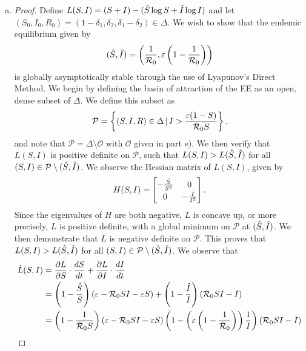\documentclass[12pt]{article}\usepackage[]{graphicx}\usepackage[]{color}
\begin{document}
\begin{enumerate}[(a)]
\item \SIRg
{\color{blue}\begin{proof}{\color{magenta}
Define $L(S, I) = (S+I) - (\Hat{S} \log{S} + \Hat{I} \log{I})$ and let $(S_0, I_0, R_0) = (1 - \delta_1, \delta_2, \delta_1 - \delta_2) \in \Delta$. We wish to show that the endemic equilibrium given by
$$(\Hat{S}, \Hat{I}) = \left(\frac{1}{{\cal R}_0}, \varepsilon \left(1 - \frac{1}{{\cal R}_0}\right)\right)$$
is globally asymptotically stable through the use of Lyapunov's Direct Method. We begin by defining the basin of attraction of the EE as an open, dense subset of $\Delta$. We define this subset as
\begin{equation*}
\begin{aligned}
\mathcal{P} = \left\{(S, I, R) \in \Delta \, | \, I > \frac{\varepsilon (1 - S)}{{\cal R}_0 S}\right\},
\end{aligned}
\end{equation*}
and note that $\mathcal{P}=\Delta \setminus \mathcal{O}$ with $\mathcal{O}$ given in part e). We then verify that $L(S, I)$ is positive definite on $\mathcal{P}$, such that $L(S, I) > L(\Hat{S}, \Hat{I})$ for all $(S, I) \in \mathcal{P} \setminus (\Hat{S}, \Hat{I})$. We observe the Hessian matrix of $L(S, I)$, given by
$$H (S, I) = \begin{bmatrix} -\frac{\Hat{S}}{S^2} & 0 \\ 0 & -\frac{\Hat{I}}{I^2} \end{bmatrix}.$$
Since the eigenvalues of $H$ are both negative, $L$ is concave up, or more precisely, $L$ is positive definite, with a global minimum on $\mathcal{P}$ at $(\Hat{S}, \Hat{I})$.
We then demonstrate that $\dot{L}$ is negative definite on $\mathcal{P}$. This proves that $L(S, I) > L(\Hat{S}, \Hat{I})$ for all $(S, I) \in \mathcal{P} \setminus (\Hat{S}, \Hat{I})$. We observe that
\begin{equation*}
\begin{aligned}
\dot{L} (S, I) &= \frac{\partial L}{\partial S} \cdot \frac{dS}{dt} + \frac{\partial L}{\partial I} \cdot \frac{dI}{dt} \\
&= \left(1 - \frac{\Hat{S}}{S}\right) (\varepsilon - {\cal R}_0 SI - \varepsilon S) + \left(1 - \frac{\Hat{I}}{I}\right) ({\cal R}_0 SI - I) \\
&= \left(1 - \frac{1}{{\cal R}_0 S}\right) (\varepsilon - {\cal R}_0 SI - \varepsilon S) \left(1 - \left(\varepsilon \left(1 - \frac{1}{{\cal R}_0}\right)\right) \frac{1}{I}\right) ({\cal R}_0 SI - I)
\end{aligned}
\end{equation*}
}
\end{proof}}
\end{enumerate}
\end{document}
